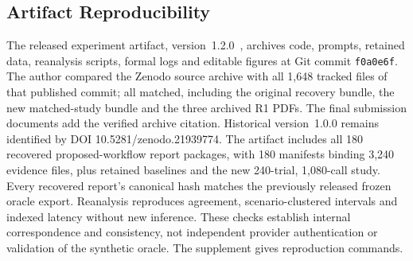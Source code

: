 \documentclass[journal]{IEEEtran}
\newif\ifshowrevisions
\newcommand{\rev}[1]{{\ifshowrevisions\color{blue}\else\color{black}\fi #1}}
\begin{document}
\subsection{Artifact Reproducibility}
\rev{The released experiment artifact, version~1.2.0~\cite{artifactRepo},
archives code, prompts, retained data, reanalysis scripts, formal logs and
editable figures at Git commit \texttt{f0a0e6f}. The author compared the
Zenodo source archive with all 1,648 tracked files of that published commit;
all matched, including the original recovery bundle, the new matched-study
bundle and the three archived R1 PDFs. The final submission documents add
the verified archive citation. Historical version~1.0.0 remains identified
by DOI 10.5281/zenodo.21939774.
The artifact includes all 180 recovered proposed-workflow report packages,
with 180 manifests binding 3,240 evidence files, plus retained baselines and
the new 240-trial, 1,080-call study. Every recovered report's canonical hash
matches the previously released frozen oracle export. Reanalysis reproduces
agreement, scenario-clustered intervals and indexed latency without new
inference. These checks establish internal correspondence and consistency,
not independent provider authentication or validation of the synthetic
oracle. The supplement gives reproduction commands.}
\end{document}
